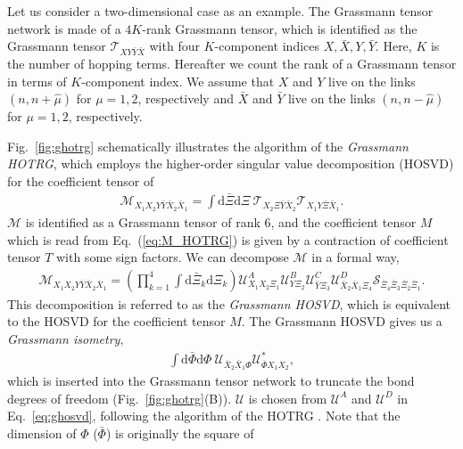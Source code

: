 \documentclass[a4paper,11pt]{article}
\newcommand{\diff}{\mathrm{d}}
\begin{document}
Let us consider a two-dimensional case as an example. 
The Grassmann tensor network is made of a $4K$-rank Grassmann tensor, which is identified as the Grassmann tensor $\mathcal{T}_{XY\bar{Y} \bar{X}}$ 
with four $K$-component indices $X,\bar{X},Y,\bar{Y}$.
Here, $K$ is the number of hopping terms.
Hereafter we count the rank of a Grassmann tensor in terms of $K$-component index. 
We assume that $X$ and $Y$ live on the links $(n,n+\hat{\mu})$ for $\mu=1,2$, respectively and $\bar{X}$ and $\bar{Y}$ live on the links $(n,n-\hat{\mu})$ for $\mu=1,2$, respectively. 



Fig.~\ref{fig:ghotrg} schematically illustrates the algorithm of the {\it Grassmann HOTRG}, 
which employs the higher-order singular value decomposition (HOSVD) for the coefficient tensor of
\begin{align}
\label{eq:M_HOTRG}
	\mathcal{M}_{X_{1}X_{2} Y \bar{Y}\bar{X}_{2}\bar{X}_{1}} = 
\int\diff\bar{\Xi}\diff\Xi \ 
\mathcal{T}_{X_{2}\Xi\bar{Y}\bar{X}_{2}} \mathcal{T}_{X_{1}Y\bar{\Xi}\bar{X}_{1}}.
\end{align}
$\mathcal{M}$ is identified as a Grassmann tensor of rank $6$, 
and the coefficient tensor $M$ which is read from Eq.~(\ref{eq:M_HOTRG}) 
is given by a contraction of coefficient tensor $T$ with some sign factors.
We can decompose $\mathcal{M}$ in a formal way,
\begin{align}
\label{eq:ghosvd}
	\mathcal{M}_{X_{1}X_{2}Y\bar{Y}\bar{X}_{2}\bar{X}_{1}}
=\left(\prod_{k=1}^{4}\int\diff\bar{\Xi}_{k}\diff\Xi_{k}
\right) 
\mathcal{U}^{A}_{X_{1}X_{2}\Xi_{1}}\mathcal{U}^{B}_{Y\Xi_{2}}\mathcal{U}^{C}_{\bar{Y}\Xi_{3}} 
\mathcal{U}^{D}_{\bar{X}_{2}\bar{X}_{1}\Xi_{4}}\mathcal{S}_{\bar{\Xi}_{4}\bar{\Xi}_{3}\bar{\Xi}_{2}\bar{\Xi}_{1}}.
\end{align}
This decomposition is referred to as the {\it Grassmann HOSVD}, which is equivalent to the HOSVD 
for the coefficient tensor $M$. The Grassmann HOSVD gives us a {\it Grassmann isometry},
\begin{align}
\label{eq:isometry}
	\int\diff\bar{\Phi}\diff\Phi \ 
	\mathcal{U}_{\bar{X}_{2}\bar{X}_{1}\Phi}\mathcal{U}^{*}_{\bar{\Phi} X_{1} X_{2}},
\end{align}
which is inserted into the Grassmann tensor network to truncate the bond degrees of 
freedom (Fig.~\ref{fig:ghotrg}(B)). $\mathcal{U}$ is chosen from $\mathcal{U}^{A}$ and $\mathcal{U}^{D}$ in 
Eq.~\eqref{eq:ghosvd}, following the algorithm of the HOTRG \cite{PhysRevB.86.045139}. 
Note  that the dimension of $\Phi$ ($\bar \Phi$) is originally the square of
\end{document}
